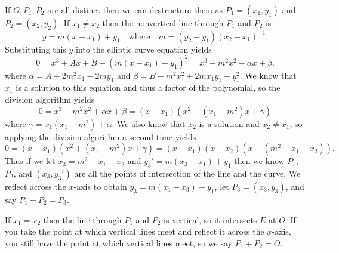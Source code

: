 \documentclass[12pt]{article}
\begin{document}
If $O, P_1, P_2$ are all distinct then we can destructure them as $P_1 = (x_1,
y_1)$ and $P_2 = (x_2, y_2)$. If $x_1 \neq x_2$ then the nonvertical line
through $P_1$ and $P_2$ is
\[
  y = m(x - x_1) + y_1 \quad\text{where}\quad m = (y_2 - y_1)(x_2 - x_1)^{-1}.
\]
Substituting this $y$ into the elliptic curve equation yields
\[
  0
  = x^3 + Ax + B - (m(x - x_1) + y_1)^2
  = x^3 - m^2x^2 + \alpha x + \beta.
\]
where $\alpha = A + 2m^2x_1 - 2my_1$ and $\beta = B - m^2x_1^2 + 2mx_1y_1 -
y_1^2$. We know that $x_1$ is a solution to this equation and thus a factor of
the polynomial, so the division algorithm yields
\[
  0
  = x^3 - m^2x^2 + \alpha x + \beta
  = (x - x_1)(x^2 + (x_1 - m^2)x + \gamma)
\]
where $\gamma = x_1(x_1 - m^2) + \alpha$. We also know that $x_2$ is a solution
and $x_2 \neq x_1$, so applying the division algorithm a second time yields
\[
  0
  = (x - x_1)(x^2 + (x_1 - m^2)x + \gamma)
  = (x - x_1)(x - x_2)(x - (m^2 - x_1 - x_2)).
\]
Thus if we let $x_3 = m^2 - x_1 - x_2$ and $y_3' = m(x_3 - x_1) + y_1$ then we
know $P_1$, $P_2$, and $(x_3, y_3')$ are all the points of intersection of the
line and the curve. We reflect across the $x$-axis to obtain $y_3 = m(x_1 - x_3)
- y_1$, let $P_3 = (x_3, y_3)$, and say $P_1 + P_2 = P_3$.

If $x_1 = x_2$ then the line through $P_1$ and $P_2$ is vertical, so it
intersects $E$ at $O$. If you take the point at which vertical lines meet and
reflect it across the $x$-axis, you still have the point at which vertical lines
meet, so we say $P_1 + P_2 = O$.
\end{document}
